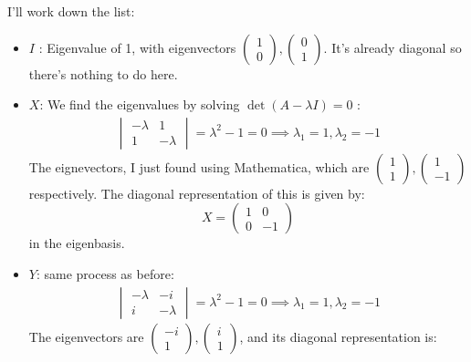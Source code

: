 \documentclass[10pt]{article}
\begin{document}
\begin{enumerate}[label=\alph*)]
			\begin{solution}
				I'll work down the list:
				\begin{itemize}
					\item \( I \) : Eigenvalue of 1, with eigenvectors \( \begin{pmatrix} 1\\0 \end{pmatrix} 
						, \begin{pmatrix} 0\\1 \end{pmatrix} \). It's already diagonal so there's nothing to do here. 
					\item \( X \): We find the eigenvalues by solving \( \det(A - \lambda I) = 0 \) :
						\begin{align*}
							\begin{vmatrix}
								-\lambda & 1 \\ 1 & -\lambda
							\end{vmatrix} = \lambda^2 - 1 = 0 \implies \lambda_1 = 1, \lambda_2 = -1
						\end{align*}
						The eignevectors, I just found using Mathematica, which are 
						\( \begin{pmatrix} 1\\1 \end{pmatrix} , \begin{pmatrix} 1\\-1 \end{pmatrix}  \) respectively. 
						The  
						diagonal representation of this is given by: 
						\[X =  \begin{pmatrix}
							1 & 0 \\ 0 & -1
						\end{pmatrix}
						\] 
						in the eigenbasis. 
					\item \( Y \): same process as before:
						\begin{align*}
							\begin{vmatrix}
								-\lambda & -i \\ i & -\lambda
							\end{vmatrix} = \lambda^2 - 1 = 0 \implies \lambda_1 = 1, \lambda_2 = -1
						\end{align*}
						The eigenvectors are \( \begin{pmatrix} -i \\ 1 \end{pmatrix} , 
						\begin{pmatrix} i\\ 1 \end{pmatrix} \), and its diagonal representation is:

\end{itemize}
\end{solution}
\end{enumerate}
\end{document}
